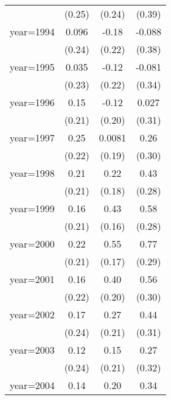 \begin{sidewaystable}[htbp]
\begin{tabular}{l*{3}{c}}
                &   (0.25)         &   (0.24)         &   (0.39)         \\
\addlinespace
year=1994       &    0.096         &    -0.18         &   -0.088         \\
                &   (0.24)         &   (0.22)         &   (0.38)         \\
\addlinespace
year=1995       &    0.035         &    -0.12         &   -0.081         \\
                &   (0.23)         &   (0.22)         &   (0.34)         \\
\addlinespace
year=1996       &     0.15         &    -0.12         &    0.027         \\
                &   (0.21)         &   (0.20)         &   (0.31)         \\
\addlinespace
year=1997       &     0.25         &   0.0081         &     0.26         \\
                &   (0.22)         &   (0.19)         &   (0.30)         \\
\addlinespace
year=1998       &     0.21         &     0.22         &     0.43         \\
                &   (0.21)         &   (0.18)         &   (0.28)         \\
\addlinespace
year=1999       &     0.16         &     0.43\sym{**} &     0.58\sym{**} \\
                &   (0.21)         &   (0.16)         &   (0.28)         \\
\addlinespace
year=2000       &     0.22         &     0.55\sym{***}&     0.77\sym{**} \\
                &   (0.21)         &   (0.17)         &   (0.29)         \\
\addlinespace
year=2001       &     0.16         &     0.40\sym{*}  &     0.56\sym{*}  \\
                &   (0.22)         &   (0.20)         &   (0.30)         \\
\addlinespace
year=2002       &     0.17         &     0.27         &     0.44         \\
                &   (0.24)         &   (0.21)         &   (0.31)         \\
\addlinespace
year=2003       &     0.12         &     0.15         &     0.27         \\
                &   (0.24)         &   (0.21)         &   (0.32)         \\
\addlinespace
year=2004       &     0.14         &     0.20         &     0.34         \\

\end{tabular}
\end{sidewaystable}
